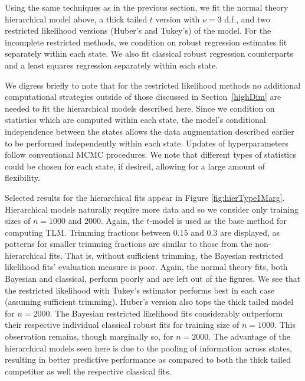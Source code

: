 \documentclass[11pt]{article}
\begin{document}
Using the same techniques as in the previous section, 
we fit the normal theory hierarchical model above, a thick tailed $t$ version with $\nu = 3$ d.f., and two restricted likelihood versions (Huber's and Tukey's) of the model.  For the incomplete restricted methods, we condition on robust regression estimates fit separately within each state. We also fit classical robust regression counterparts and a least squares regression separately within each state.  

We digress briefly to note that for the restricted likelihood methods no additional computational strategies outside of those discussed in Section~\ref{highDim} are needed to fit the hierarchical models described here. Since we condition on statistics which are computed within each state, the model's conditional independence between the states allows the data augmentation described earlier to be performed independently within each state.  Updates of hyperparameters follow conventional MCMC procedures.  We note that different types of statistics could be chosen for each state, if desired, allowing for a large amount of flexibility.  

Selected results for the hierarchical fits appear in Figure
\ref{fig:hierType1Marg}. Hierarchical models naturally require more
data and so we consider only training sizes of $n=1000$ and
$2000$.  Again, the $t$-model is used as the base
method for computing TLM. Trimming fractions between $0.15$ and $0.3$ are displayed, as patterns for smaller trimming fractions are similar to those from the non-hierarchical fits. That is, without sufficient trimming, the Bayesian restricted likelihood fits' evaluation measure is poor. Again, the normal theory fits, both Bayesian and classical, perform poorly and are left out of the figures.  We see that the restricted likelihood with Tukey's estimator performs best in each case (assuming sufficient trimming). Huber's version also tops the thick tailed model for $n=2000$.  The Bayesian restricted likelihood fits considerably outperform their respective individual classical robust fits for training size of $n=1000$. This observation remains, though marginally so, for $n=2000$. The advantage of the hierarchical models seen here is due to the pooling of information across states, resulting in better predictive performance as compared to both the thick tailed competitor as well the respective classical fits.
\end{document}
